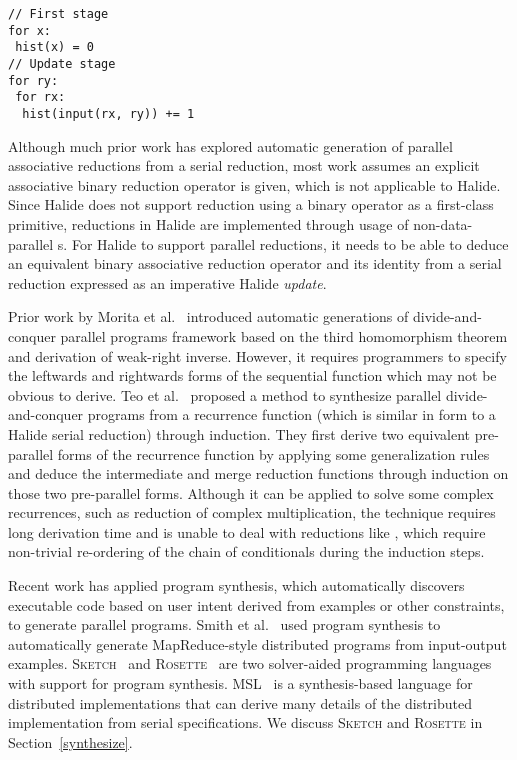 \begin{lstlisting}[caption={Computing the histogram of an image is hard to parallelize in Halide, since its update stage would be expressed with serial \code{RVar}s.}, label={lst:histogram_loopness}]
// First stage
for x:
 hist(x) = 0
// Update stage
for ry:
 for rx:
  hist(input(rx, ry)) += 1
\end{lstlisting}

Although much prior work has explored automatic generation of parallel associative reductions from a serial reduction, most work assumes an explicit associative binary reduction operator is given, which is not applicable to Halide. Since Halide does not support reduction using a binary operator as a first-class primitive, reductions in Halide are implemented through usage of non-data-parallel s. For Halide to support parallel reductions, it needs to be able to deduce an equivalent binary associative reduction operator and its identity from a serial reduction expressed as an imperative Halide \emph{update}. 

Prior work by Morita et al.~\cite{Morita:2007:AIG:1250734.1250752} introduced automatic generations of divide-and-conquer parallel programs framework based on the third homomorphism theorem and derivation of weak-right inverse. However, it requires programmers to specify the leftwards and rightwards forms of the sequential function which may not be obvious to derive. Teo et al.~\cite{Teo:1997:DEP:266670.266697} proposed a method to synthesize parallel divide-and-conquer
programs from a recurrence function (which is similar in form to a Halide serial reduction) through induction. They first derive two equivalent pre-parallel forms of the recurrence function by applying some generalization rules and deduce the intermediate and merge reduction functions through induction on those two pre-parallel forms. Although it can be applied to solve some complex recurrences, such as reduction of complex multiplication, the technique requires long derivation time and is unable to deal with reductions like , which require non-trivial re-ordering of the chain of conditionals during the induction steps. 

Recent work has applied program synthesis, which automatically discovers executable code based on user intent derived from examples or other constraints, to generate parallel programs. Smith et al.~\cite{Smith:2016:MPS:2908080.2908102} used program synthesis to automatically generate MapReduce-style distributed programs from input-output examples. \textsc{Sketch}~\cite{Solar-Lezama:2008:PSS:1714168} and \textsc{Rosette}~\cite{Torlak:2013:GSL:2509578.2509586} are two solver-aided programming languages with support for program synthesis.  MSL~\cite{Xu:2014:MSE:2683593.2683628} is a synthesis-based language for distributed implementations that can derive many details of the distributed implementation from serial specifications.  We discuss \textsc{Sketch} and \textsc{Rosette} in Section~\ref{synthesize}.

